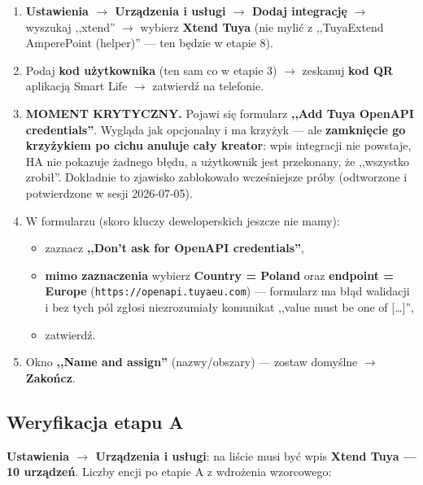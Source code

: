 \documentclass[11pt,a4paper]{article}
\begin{document}
\begin{enumerate}
\item \textbf{Ustawienia $\to$ Urządzenia i usługi $\to$ Dodaj integrację} $\to$ wyszukaj ,,xtend'' $\to$ wybierz \textbf{Xtend Tuya} (nie mylić z ,,TuyaExtend AmperePoint (helper)'' --- ten będzie w etapie 8).
\item Podaj \textbf{kod użytkownika} (ten sam co w etapie 3) $\to$ zeskanuj \textbf{kod QR} aplikacją Smart Life $\to$ zatwierdź na telefonie.
\item \textbf{MOMENT KRYTYCZNY.} Pojawi się formularz \textbf{,,Add Tuya OpenAPI credentials''}. Wygląda jak opcjonalny i ma krzyżyk --- ale \textbf{zamknięcie go krzyżykiem po cichu anuluje cały kreator}: wpis integracji nie powstaje, HA nie pokazuje żadnego błędu, a użytkownik jest przekonany, że ,,wszystko zrobił''. Dokładnie to zjawisko zablokowało wcześniejsze próby (odtworzone i potwierdzone w sesji 2026-07-05).
\item W formularzu (skoro kluczy deweloperskich jeszcze nie mamy):
  \begin{itemize}
  \item zaznacz \textbf{,,Don't ask for OpenAPI credentials''},
  \item \textbf{mimo zaznaczenia} wybierz \textbf{Country = Poland} oraz \textbf{endpoint = Europe} (\texttt{https://openapi.tuyaeu.com}) --- formularz ma błąd walidacji i bez tych pól zgłosi niezrozumiały komunikat ,,value must be one of [\ldots]'',
  \item zatwierdź.
  \end{itemize}
\item Okno \textbf{,,Name and assign''} (nazwy/obszary) --- zostaw domyślne $\to$ \textbf{Zakończ}.
\end{enumerate}

\subsection{Weryfikacja etapu A}

\textbf{Ustawienia $\to$ Urządzenia i usługi}: na liście musi być wpis \textbf{Xtend Tuya --- 10 urządzeń}. Liczby encji po etapie A z wdrożenia wzorcowego:
\end{document}
